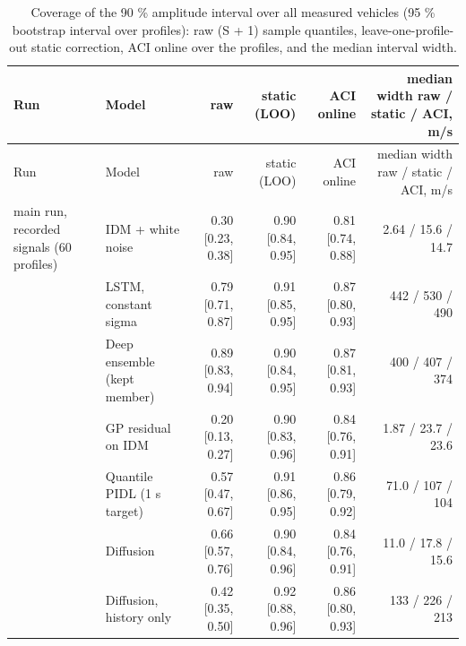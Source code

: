 \begingroup
\small
\begin{longtable}{llrrrr}
\caption{Coverage of the 90 \% amplitude interval over all measured vehicles (95 \% bootstrap interval over profiles): raw (S + 1) sample quantiles, leave-one-profile-out static correction, ACI online over the profiles, and the median interval width.}\label{tab:t6-amplitude-coverage} \\
\toprule
Run & Model & raw & static (LOO) & ACI online & median width raw / static / ACI, m/s \\
\midrule
\endfirsthead
\toprule
Run & Model & raw & static (LOO) & ACI online & median width raw / static / ACI, m/s \\
\midrule
\endhead
\bottomrule
\endlastfoot
main run, recorded signals (60 profiles) & IDM + white noise & 0.30 [0.23, 0.38] & 0.90 [0.84, 0.95] & 0.81 [0.74, 0.88] & 2.64 / 15.6 / 14.7 \\
 & LSTM, constant sigma & 0.79 [0.71, 0.87] & 0.91 [0.85, 0.95] & 0.87 [0.80, 0.93] & 442 / 530 / 490 \\
 & Deep ensemble (kept member) & 0.89 [0.83, 0.94] & 0.90 [0.84, 0.95] & 0.87 [0.81, 0.93] & 400 / 407 / 374 \\
 & GP residual on IDM & 0.20 [0.13, 0.27] & 0.90 [0.83, 0.96] & 0.84 [0.76, 0.91] & 1.87 / 23.7 / 23.6 \\
 & Quantile PIDL (1 s target) & 0.57 [0.47, 0.67] & 0.91 [0.86, 0.95] & 0.86 [0.79, 0.92] & 71.0 / 107 / 104 \\
 & Diffusion & 0.66 [0.57, 0.76] & 0.90 [0.84, 0.96] & 0.84 [0.76, 0.91] & 11.0 / 17.8 / 15.6 \\
 & Diffusion, history only & 0.42 [0.35, 0.50] & 0.92 [0.88, 0.96] & 0.86 [0.80, 0.93] & 133 / 226 / 213 \\

\end{longtable}
